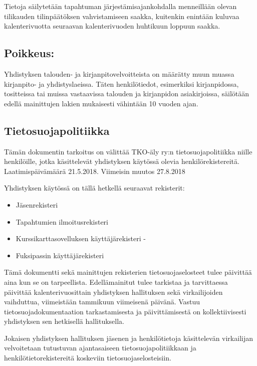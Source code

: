 \documentclass[finnish]{tktltiki}
\begin{document}
Tietoja säilytetään tapahtuman järjestämisajankohdalla menneillään olevan tilikauden tilinpäätöksen vahvistamiseen saakka, kuitenkin enintään kuluvaa kalenterivuotta seuraavan kalenterivuoden huhtikuun loppuun saakka.

\subsection*{Poikkeus:}

Yhdistyksen talouden- ja kirjanpitovelvoitteista on määrätty muun muassa kirjanpito- ja yhdistyslaeissa. Täten henkilötiedot, esimerkiksi kirjanpidossa, tositteissa tai muissa vastaavissa talouden ja kirjanpidon asiakirjoissa, säilötään edellä mainittujen lakien mukaisesti vähintään 10 vuoden ajan.


\pagestyle{empty}


\subsection*{Tietosuojapolitiikka}
Tämän dokumentin tarkoitus on välittää TKO-äly ry:n tietosuojapolitiikka niille henkilöille, jotka käsittelevät yhdistyksen käytössä olevia henkilörekistereitä. Laatimispäivämäärä 21.5.2018. Viimeisin muutos 27.8.2018

Yhdistyksen käytössä on tällä hetkellä seuraavat rekisterit:

\begin{itemize}
\item Jäsenrekisteri  
\item Tapahtumien ilmoitusrekisteri
\item Kurssikarttasovelluksen käyttäjärekisteri
-\item Fuksipassin käyttäjärekisteri
\end{itemize}
Tämä dokumentti sekä mainittujen rekisterien tietosuojaselosteet tulee päivittää aina kun se on tarpeellista. Edellämainitut tulee tarkistaa ja tarvittaessa päivittää kalenterivuosittain yhdistyksen hallituksen sekä virkailijoiden vaihduttua, viimeistään tammikuun viimeisenä päivänä. Vastuu tietosuojadokumentaation tarkastamisesta ja päivittämisestä on kollektiivisesti yhdistyksen sen hetkisellä hallituksella.

Jokaisen yhdistyksen hallituksen jäsenen ja henkilötietoja käsittelevän virkailijan velvoitetaan tutustuvan ajantasaiseen tietosuojapolitiikkaan ja henkilötietorekistereitä koskeviin tietosuojaselosteisiin.
\end{document}
